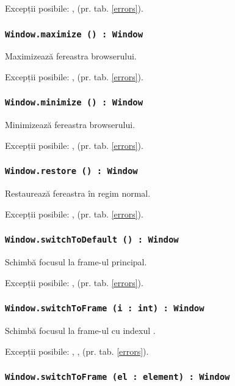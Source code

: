 Excepții posibile: ,  (pr. tab. \ref{errors}).

\subsubsection{\lstinline|Window.maximize () : Window|}

Maximizează fereastra browserului.

Excepții posibile: ,  (pr. tab. \ref{errors}).

\subsubsection{\lstinline|Window.minimize () : Window|}

Minimizează fereastra browserului.

Excepții posibile: ,  (pr. tab. \ref{errors}).

\subsubsection{\lstinline|Window.restore () : Window|}

Restaurează fereastra în regim normal.

Excepții posibile: ,  (pr. tab. \ref{errors}).

\subsubsection{\lstinline|Window.switchToDefault () : Window|}

Schimbă focusul la frame-ul principal.

Excepții posibile: ,  (pr. tab. \ref{errors}).

\subsubsection{\lstinline|Window.switchToFrame (i : int) : Window|}

Schimbă focusul la frame-ul cu indexul .

Excepții posibile: , ,  (pr. tab. \ref{errors}).

\subsubsection{\lstinline|Window.switchToFrame (el : element) : Window|}

